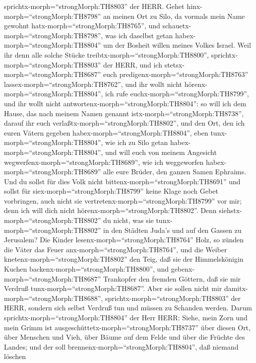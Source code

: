 sprichtx-morph=``strongMorph:TH8803'' der HERR.  Gehet
hinx-morph=``strongMorph:TH8798'' an meinen Ort zu Silo, da vormals mein
Name gewohnt hatx-morph=``strongMorph:TH8765'', und
schauetx-morph=``strongMorph:TH8798'', was ich daselbst getan
habex-morph=``strongMorph:TH8804'' um der Bosheit willen meines Volkes
Israel.  Weil ihr denn alle solche Stücke
treibtx-morph=``strongMorph:TH8800'',
sprichtx-morph=``strongMorph:TH8803'' der HERR, und ich
stetsx-morph=``strongMorph:TH8687'' euch
predigenx-morph=``strongMorph:TH8763''
lassex-morph=``strongMorph:TH8762'', und ihr wollt nicht
hörenx-morph=``strongMorph:TH8804'', ich rufe
euchx-morph=``strongMorph:TH8799'', und ihr wollt nicht
antwortenx-morph=``strongMorph:TH8804'':  so will ich dem
Hause, das nach meinem Namen genannt istx-morph=``strongMorph:TH8738'',
darauf ihr euch verlaßtx-morph=``strongMorph:TH8802'', und den Ort, den
ich euren Vätern gegeben habex-morph=``strongMorph:TH8804'', eben
tunx-morph=``strongMorph:TH8804'', wie ich zu Silo getan
habex-morph=``strongMorph:TH8804'',  und will euch von
meinem Angesicht wegwerfenx-morph=``strongMorph:TH8689'', wie ich
weggeworfen habex-morph=``strongMorph:TH8689'' alle eure Brüder, den
ganzen Samen Ephraims.  Und du sollst für dies Volk nicht
bittenx-morph=``strongMorph:TH8691'' und sollst für
siex-morph=``strongMorph:TH8799'' keine Klage noch Gebet vorbringen,
auch nicht sie vertretenx-morph=``strongMorph:TH8799'' vor mir; denn ich
will dich nicht hörenx-morph=``strongMorph:TH8802''.  Denn
siehstx-morph=``strongMorph:TH8802'' du nicht, was sie
tunx-morph=``strongMorph:TH8802'' in den Städten Juda's und auf den
Gassen zu Jerusalem?  Die Kinder
lesenx-morph=``strongMorph:TH8764'' Holz, so zünden die Väter das Feuer
anx-morph=``strongMorph:TH8764'', und die Weiber
knetenx-morph=``strongMorph:TH8802'' den Teig, daß sie der
Himmelskönigin Kuchen backenx-morph=``strongMorph:TH8800'', und
gebenx-morph=``strongMorph:TH8687'' Trankopfer den fremden Göttern, daß
sie mir Verdruß tunx-morph=``strongMorph:TH8687''.  Aber
sie sollen nicht mir damitx-morph=``strongMorph:TH8688'',
sprichtx-morph=``strongMorph:TH8803'' der HERR, sondern sich selbst
Verdruß tun und müssen zu Schanden werden.  Darum
sprichtx-morph=``strongMorph:TH8804'' der Herr HERR: Siehe, mein Zorn
und mein Grimm ist ausgeschüttetx-morph=``strongMorph:TH8737'' über
diesen Ort, über Menschen und Vieh, über Bäume auf dem Felde und über
die Früchte des Landes; und der soll
brennenx-morph=``strongMorph:TH8804'', daß niemand löschen
